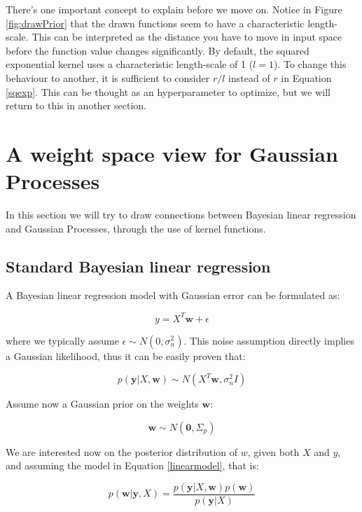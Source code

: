 \documentclass[10pt,a4paper,twoside]{book}
\begin{document}
There's one important concept to explain before we move on. Notice in Figure \ref{fig:drawPrior} that the drawn functions seem to have a characteristic length-scale. This can be interpreted as the distance you have to move in input space before the function value changes significantly. By default, the squared exponential kernel uses a characteristic length-scale of 1 ($l = 1$). To change this behaviour to another, it is sufficient to consider $r/l$ instead of $r$ in Equation \ref{sqexp}. This can be thought as an hyperparameter to optimize, but we will return to this in another section.

\section{A weight space view for Gaussian Processes}

In this section we will try to draw connections between Bayesian linear regression and  Gaussian Processes, through the use of kernel functions. 

\subsection{Standard Bayesian linear regression}

A Bayesian linear regression model with Gaussian error can be formulated as:

\begin{equation}
\label{linearmodel}
y = X^T \boldsymbol{w} + \epsilon
\end{equation} 

where we typically assume $\epsilon \sim N(0, \sigma_n^2)$. This noise assumption directly implies a Gaussian likelihood, thus it can be easily proven that:

\begin{equation}
p(\boldsymbol{y}|X, \boldsymbol{w}) \sim N (X^T\boldsymbol{w}, \sigma_n^2 I)
\end{equation}

Assume now a Gaussian prior on the weights $\boldsymbol{w}$:

\begin{equation}
\label{wprior}
\boldsymbol{w} \sim N(\boldsymbol{0}, \Sigma_p)
\end{equation}

We are interested now on the posterior distribution of $w$, given both $X$ and $y$, and assuming the model in Equation \ref{linearmodel}, that is:

\begin{equation}
p(\boldsymbol{w}|\boldsymbol{y}, X) = \dfrac{p(\boldsymbol{y}|X, \boldsymbol{w}) p(\boldsymbol{w})}{p(\boldsymbol{y}| X)}
\end{equation}
\end{document}

